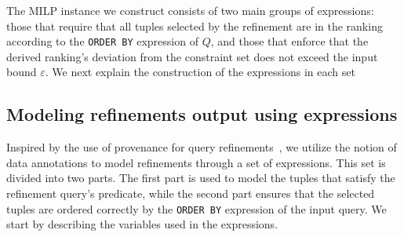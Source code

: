 The MILP instance we construct consists of two main groups of expressions: those that require that all tuples selected by the refinement are in the ranking according to the {\tt ORDER BY} expression of $Q$, and those that enforce that the derived ranking's deviation from the constraint set does not exceed the input bound $\varepsilon$. We next explain the construction of the expressions in each set


\subsection{Modeling refinements output using expressions}

Inspired by the use of provenance for query refinements~\cite{MLJ22,ERICA}, we utilize the notion of data annotations to model refinements through a set of expressions. This set is divided into two parts. The first part is used to model the tuples that satisfy the refinement query's predicate, while the second part ensures that the selected tuples are ordered correctly by the {\tt ORDER BY} expression of the input query. We start by describing the variables used in the expressions.



		
